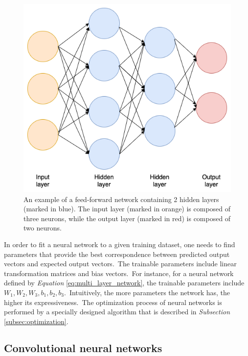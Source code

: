\documentclass[longabstract, english, mgr]{iithesis}
\theoremstyle{default_theorem_style}\newtheorem{theorem}{Theorem}
\theoremstyle{default_theorem_style}\newtheorem{definition}{Definition}
\begin{document}
\begin{figure}[t]
\centering
\includegraphics[scale=0.45]{neural_network}
\caption{An example of a feed-forward network containing 2 hidden layers (marked in blue). The input layer
(marked in orange) is composed of three neurons, while the output layer (marked in red) is composed of two neurons.}
\label{fig:neural_network}
\end{figure}

\noindent In order to fit a neural network to a given training dataset, one needs to find parameters that provide the
best correspondence between predicted output vectors and expected output vectors.\ The trainable parameters include
linear transformation matrices and bias vectors.\ For instance, for a neural network defined by
\textit{Equation} \ref{eq:multi_layer_network}, the trainable parameters include
$W_1, W_2, W_3, b_1, b_2, b_3$.\ Intuitively, the more parameters the network has, the higher its expressiveness.\ The
optimization process of neural networks is performed by a specially designed algorithm that is
described in \textit{Subsection} \ref{subsec:optimization}.

\subsection{Convolutional neural networks}
\end{document}

